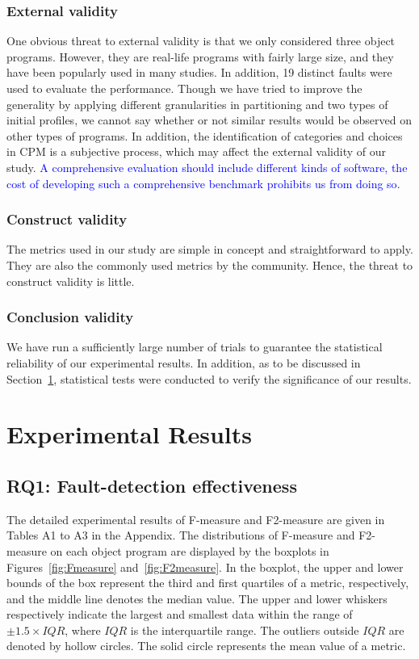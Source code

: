\documentclass[10pt,journal,compsoc]{IEEEtran}
\begin{document}
\subsubsection{External validity}
One obvious threat to external validity is that we only considered three object programs. However, they are real-life programs with fairly large size, and they have been popularly used in many studies. In addition, 19 distinct faults were used to evaluate the performance. Though we have tried to improve the generality by applying different granularities in partitioning and two types of initial profiles, we cannot say whether or not similar results would be observed on other types of programs. In addition, the identification of categories and choices in CPM is a subjective process, which may affect the external validity of our study. \textcolor{blue}{A comprehensive evaluation should include different kinds of software, the cost of developing such a comprehensive benchmark prohibits us from doing so}.

\subsubsection{Construct validity}
The metrics used in our study are simple in concept and straightforward to apply. They are also the commonly used metrics by the community. Hence, the threat to construct validity is little.

\subsubsection{Conclusion validity}
We have run a sufficiently large number of trials to guarantee the statistical reliability of our experimental results. In addition, as to be discussed in Section~\ref{sec:results}, statistical tests were conducted to verify the significance of our results.

\section{Experimental Results}
\label{sec:results}

\subsection{RQ1: Fault-detection effectiveness}

The detailed experimental results of F-measure and F2-measure are given in Tables A1 to A3 in the Appendix. The distributions of F-measure and F2-measure on each object program are displayed by the boxplots in Figures~\ref{fig:Fmeasure} and~\ref{fig:F2measure}. In the boxplot, the upper and lower bounds of the box represent the third and first quartiles of a metric, respectively, and the middle line denotes the median value. The upper and lower whiskers respectively indicate the largest and smallest data within the range of $\pm 1.5 \times IQR$, where $IQR$ is the interquartile range. The outliers outside $IQR$ are denoted by hollow circles. The solid circle represents the mean value of a metric.
\end{document}
